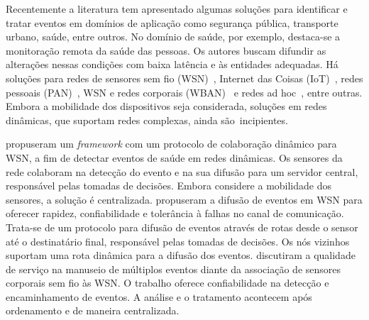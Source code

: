 \documentclass[12pt]{article}
\begin{document}
Recentemente %
a literatura
tem apresentado algumas 
soluções para identificar e tratar eventos em domínios de aplicação como segurança pública, transporte urbano, saúde, entre outros. No domínio de saúde, por exemplo, destaca-se a monitoração remota da saúde das pessoas. Os autores buscam difundir as alterações nessas condições com baixa latência e às entidades adequadas. Há soluções para redes de sensores sem fio (WSN)~\cite{boukerche2004fast,wu2016dynamic}, Internet das Coisas (IoT)~\cite{dar2015resource}, redes pessoais (PAN)~\cite{blount2007remote}, WSN e redes corporais (WBAN)~\cite{souil2011qos} e redes ad hoc~\cite{nittel2012localalert, batista2019sbseg}, entre outras. Embora a mobilidade dos dispositivos seja considerada, soluções 
em 
redes dinâmicas, que 
suportam 
redes complexas, ainda são~incipientes.

\cite{wu2016dynamic} propuseram um \textit{framework} com um protocolo de colaboração dinâmico para WSN, a fim de detectar eventos de saúde em redes dinâmicas. Os 
sensores 
da rede colaboram na detecção do evento e na sua difusão para um servidor central, responsável pelas tomadas de decisões. Embora considere a mobilidade dos sensores, a solução é centralizada. \cite{boukerche2004fast} propuseram a difusão de eventos em WSN para oferecer rapidez, confiabilidade e tolerância à falhas no canal de comunicação. Trata-se de um protocolo para difusão de eventos através de rotas desde o sensor até o destinatário final, responsável pelas tomadas de decisões. Os nós vizinhos suportam uma rota dinâmica para a difusão dos eventos. \cite{souil2011qos} discutiram a qualidade de serviço na manuseio de múltiplos eventos diante da associação de sensores corporais sem fio às WSN. O trabalho oferece confiabilidade na detecção e encaminhamento de eventos. A análise e o tratamento acontecem após ordenamento e de maneira centralizada.

\end{document}
